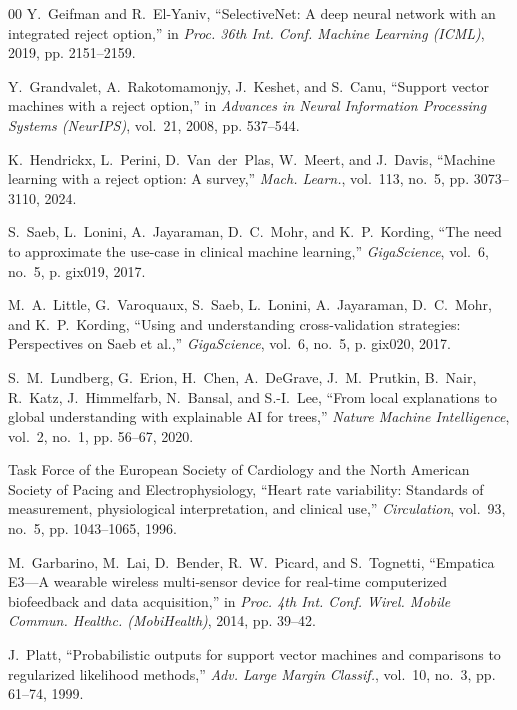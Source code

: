 \documentclass[conference]{IEEEtran}
\begin{document}
\begin{thebibliography}{00}
Y.~Geifman and R.~El-Yaniv, ``SelectiveNet: A deep neural network with an integrated reject option,'' in \textit{Proc. 36th Int. Conf. Machine Learning (ICML)}, 2019, pp. 2151--2159.

Y.~Grandvalet, A.~Rakotomamonjy, J.~Keshet, and S.~Canu, ``Support vector machines with a reject option,'' in \textit{Advances in Neural Information Processing Systems (NeurIPS)}, vol.~21, 2008, pp. 537--544.

K.~Hendrickx, L.~Perini, D.~Van~der~Plas, W.~Meert, and J.~Davis, ``Machine learning with a reject option: A survey,'' \textit{Mach. Learn.}, vol.~113, no.~5, pp. 3073--3110, 2024.

S.~Saeb, L.~Lonini, A.~Jayaraman, D.~C.~Mohr, and K.~P.~Kording, ``The need to approximate the use-case in clinical machine learning,'' \textit{GigaScience}, vol.~6, no.~5, p. gix019, 2017.

M.~A.~Little, G.~Varoquaux, S.~Saeb, L.~Lonini, A.~Jayaraman, D.~C.~Mohr, and K.~P.~Kording, ``Using and understanding cross-validation strategies: Perspectives on Saeb et al.,'' \textit{GigaScience}, vol.~6, no.~5, p. gix020, 2017.

S.~M.~Lundberg, G.~Erion, H.~Chen, A.~DeGrave, J.~M.~Prutkin, B.~Nair, R.~Katz, J.~Himmelfarb, N.~Bansal, and S.-I.~Lee, ``From local explanations to global understanding with explainable AI for trees,'' \textit{Nature Machine Intelligence}, vol.~2, no.~1, pp. 56--67, 2020.

Task Force of the European Society of Cardiology and the North American Society of Pacing and Electrophysiology, ``Heart rate variability: Standards of measurement, physiological interpretation, and clinical use,'' \textit{Circulation}, vol.~93, no.~5, pp. 1043--1065, 1996.

M.~Garbarino, M.~Lai, D.~Bender, R.~W.~Picard, and S.~Tognetti, ``Empatica E3---A wearable wireless multi-sensor device for real-time computerized biofeedback and data acquisition,'' in \textit{Proc. 4th Int. Conf. Wirel. Mobile Commun. Healthc. (MobiHealth)}, 2014, pp. 39--42.

J.~Platt, ``Probabilistic outputs for support vector machines and comparisons to regularized likelihood methods,'' \textit{Adv. Large Margin Classif.}, vol.~10, no.~3, pp. 61--74, 1999.


\end{thebibliography}
\end{document}
